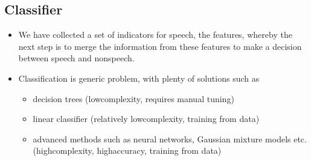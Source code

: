 \documentclass[letterpaper,10pt,english]{jupyterBook}
\begin{document}
\subsection{Classifier}
\label{\detokenize{Recognition/Voice_activity_detection:classifier}}\begin{itemize}
\item {} 
\sphinxAtStartPar
We have collected a set of indicators for speech, the features,
whereby the next step is to merge the information from these
features to make a decision between speech and non\sphinxhyphen{}speech.

\item {} 
\sphinxAtStartPar
Classification is generic problem, with plenty of solutions such as
\begin{itemize}
\item {} 
\sphinxAtStartPar
decision trees (low\sphinxhyphen{}complexity, requires manual tuning)

\item {} 
\sphinxAtStartPar
linear classifier (relatively low\sphinxhyphen{}complexity, training from
data)

\item {} 
\sphinxAtStartPar
advanced methods such as neural networks, Gaussian mixture
models etc. (high\sphinxhyphen{}complexity, high\sphinxhyphen{}accuracy, training from data)

\end{itemize}

\end{itemize}
\end{document}

